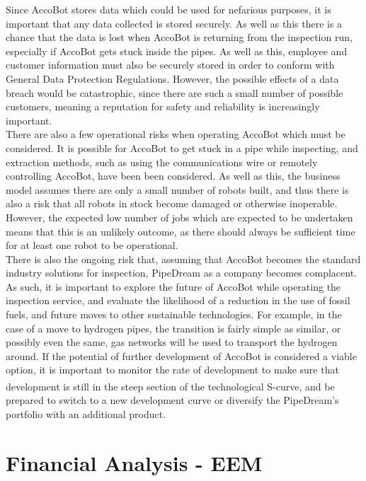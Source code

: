 \documentclass[11pt]{article}		%
\newcommand{\supercite}[1]{\textsuperscript{\cite{#1}}}		%
\begin{document}
     	Since AccoBot stores data which could be used for nefarious purposes, it is important that any data collected is stored securely.
     	As well as this there is a chance that the data is lost when AccoBot is returning from the inspection run, especially if AccoBot gets stuck inside the pipes.
     	As well as this, employee and customer information must also be securely stored in order to conform with General Data Protection Regulations.
     	However, the possible effects of a data breach would be catastrophic, since there are such a small number of possible customers, meaning a reputation for safety and reliability is increasingly important.
     	\\
     	There are also a few operational risks when operating AccoBot which must be considered.
     	It is possible for AccoBot to get stuck in a pipe while inspecting, and extraction methods, such as using the communications wire or remotely controlling AccoBot, have been been considered.
     	As well as this, the business model assumes there are only a small number of robots built, and thus there is also a risk that all robots in stock become damaged or otherwise inoperable.
     	However, the expected low number of jobs which are expected to be undertaken means that this is an unlikely outcome, as there should always be sufficient time for at least one robot to be operational.
     	\\
     	There is also the ongoing risk that, assuming that AccoBot becomes the standard industry solutions for inspection, PipeDream as a company becomes complacent.
     	As such, it is important to explore the future of AccoBot while operating the inspection service, and evaluate the likelihood of a reduction in the use of fossil fuels, and future moves to other sustainable technologies.
     	For example, in the case of a move to hydrogen pipes, the transition is fairly simple as similar, or possibly even the same, gas networks will be used to transport the hydrogen around.
     	If the potential of further development of AccoBot is considered a viable option, it is important to monitor the rate of development to make sure that development is still in the steep section of the technological S-curve\supercite{christensen1998innovation}, and be prepared to switch to a new development curve or diversify the PipeDream's portfolio with an additional product.
     	
 	\section{Financial Analysis - EEM}
 	
\end{document}
